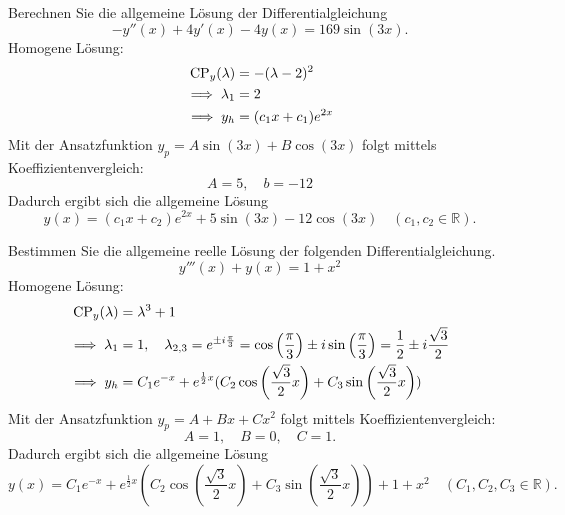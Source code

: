 Berechnen Sie die allgemeine Lösung der Differentialgleichung
\begin{displaymath}
  -y''(x) + 4y'(x) - 4y(x) = 169 \sin(3x). 
\end{displaymath}
Homogene Lösung:
\begin{align*}
  \operatorname{CP}_y(\lambda) &= -(\lambda - 2)^2\\
  \implies \lambda_1 &= 2\\
  \implies y_h &= (c_1 x + c_1)e^{2x}
\end{align*}
Mit der Ansatzfunktion $y_p = A\sin(3x) + B\cos(3x)$ folgt mittels Koeffizientenvergleich:
\begin{displaymath}
  A = 5, \quad b = -12
\end{displaymath}
Dadurch ergibt sich die allgemeine Lösung
\begin{displaymath}
  y(x) = (c_1 x + c_2)e^{2x} + 5\sin(3x) - 12\cos(3x) \quad (c_1, c_2 \in \mathbb{R}).
\end{displaymath}

Bestimmen Sie die allgemeine reelle Lösung der folgenden Differentialgleichung.
\begin{displaymath}
  y'''(x) + y(x) = 1 + x^2
\end{displaymath}
Homogene Lösung:
\begin{align*}
  \operatorname{CP}_y(\lambda) &= \lambda^3 + 1\\
  \implies \lambda_1 &= 1, \quad \lambda_{2,3} = e^{\pm i \frac{\pi}{3}} = \cos\left(\frac{\pi}{3}\right) \pm i \sin\left(\frac{\pi}{3}\right) = \frac{1}{2} \pm i \frac{\sqrt{3}}{2}\\
  \implies y_h &= C_1 e^{-x} + e^{\frac{1}{2} x} (C_2 \cos\left(\frac{\sqrt{3}}{2}x\right) + C_3 \sin\left(\frac{\sqrt{3}}{2}x\right))
\end{align*}
Mit der Ansatzfunktion $y_p = A + Bx + Cx^2$ folgt mittels Koeffizientenvergleich:
\begin{displaymath}
  A = 1, \quad B = 0, \quad C = 1.
\end{displaymath}
Dadurch ergibt sich die allgemeine Lösung
\begin{displaymath}
  y(x) = C_1 e^{-x} + e^{\frac{1}{2} x} (C_2 \cos\left(\frac{\sqrt{3}}{2}x\right) + C_3 \sin\left(\frac{\sqrt{3}}{2}x\right)) + 1 + x^2 \quad (C_1, C_2, C_3 \in \mathbb{R}).
\end{displaymath}

